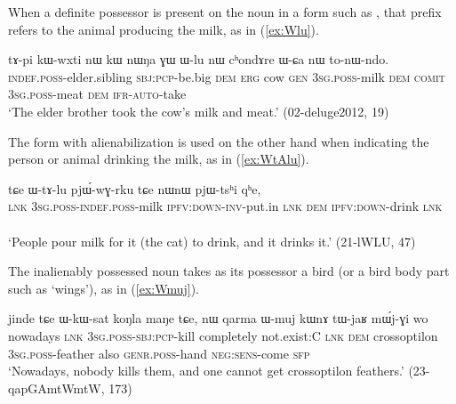  When a definite possessor is present on the noun  in a form such as , that prefix refers to the animal producing the milk, as in (\ref{ex:Wlu}).
 
 \begin{exe}
\ex \label{ex:Wlu}
 \gll 
tɤ-pi kɯ-wxti nɯ kɯ nɯŋa ɣɯ ɯ-lu nɯ cʰondɤre  ɯ-ɕa nɯ to-nɯ-ndo. \\
\textsc{indef}.\textsc{poss}-elder.sibling \textsc{sbj}:\textsc{pcp}-be.big \textsc{dem} \textsc{erg} cow \textsc{gen} \textsc{3sg}.\textsc{poss}-milk \textsc{dem} \textsc{comit} \textsc{3sg}.\textsc{poss}-meat \textsc{dem} \textsc{ifr}-\textsc{auto}-take \\
\glt `The elder brother took the cow's milk and meat.' (02-deluge2012, 19)
 \end{exe}

The form  with alienabilization is used on the other hand when indicating the person or animal drinking the milk, as in (\ref{ex:WtAlu}).

\begin{exe}
\ex \label{ex:WtAlu}
 \gll tɕe ɯ-tɤ-lu pjɯ́-wɣ-rku tɕe nɯnɯ pjɯ-tsʰi qʰe,\\
\textsc{lnk} \textsc{3sg}.\textsc{poss}-\textsc{indef}.\textsc{poss}-milk \textsc{ipfv}:\textsc{down}-\textsc{inv}-put.in  \textsc{lnk} \textsc{dem} \textsc{ipfv}:\textsc{down}-drink \textsc{lnk}\\ \\
\glt `People pour milk for it (the cat) to drink, and it drinks it.' (21-lWLU, 47)
\end{exe}


The inalienably possessed noun  takes as its possessor a bird (or a bird body part such as `wings'), as in (\ref{ex:Wmuj}).

    \begin{exe}
\ex \label{ex:Wmuj}
 \gll   jinde tɕe ɯ-kɯ-sat koŋla maŋe tɕe, nɯ qarma ɯ-muj kɯnɤ tɯ-jaʁ mɯ́j-ɣi wo \\
 nowadays \textsc{lnk} \textsc{3sg}.\textsc{poss}-\textsc{sbj}:\textsc{pcp}-kill completely not.exist:C \textsc{lnk} \textsc{dem} crossoptilon \textsc{3sg}.\textsc{poss}-feather also \textsc{genr}.\textsc{poss}-hand \textsc{neg}:\textsc{sens}-come \textsc{sfp} \\
 \glt `Nowadays, nobody kills them, and one cannot get crossoptilon feathers.' (23-qapGAmtWmtW, 173)
  \end{exe}


